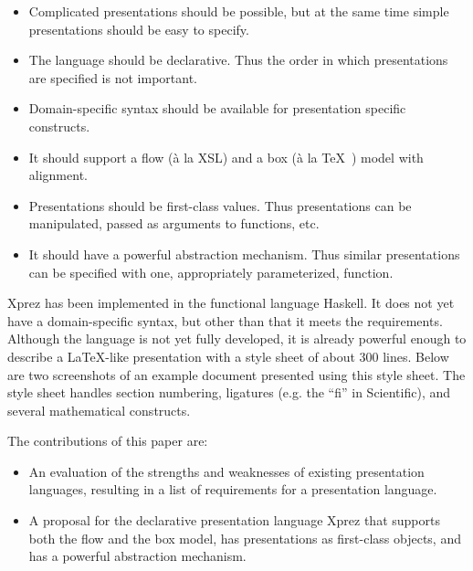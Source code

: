 \begin{itemize}
\item Complicated presentations should be possible, but at the same time simple presentations should be easy to specify.
\item The language should be declarative. Thus the order in which presentations are specified is not important.
\item Domain-specific syntax should be available for presentation specific constructs. 
\item It should support a flow (\`a la XSL) and a box (\`a la \TeX~\cite{tex}) model with alignment.
\item Presentations should be first-class values. Thus presentations can be manipulated, passed as arguments to functions, etc.
\item It should have a powerful abstraction mechanism. Thus similar presentations can be specified with one, appropriately parameterized, function.
\end{itemize}

{\sc Xprez} has been implemented in the functional language Haskell. It does not yet have a domain-specific syntax, but other than that it meets the requirements. Although the language is not yet fully developed, it is already powerful enough to describe a \LaTeX -like presentation with a style sheet of about 300 lines. Below are two screenshots of an example document presented using this style sheet. The style sheet handles section numbering, ligatures (e.g. the ``fi'' in Scientific), and several mathematical constructs.

\begin{center}
 \qquad
{}
\end{center}

The contributions of this paper are:

\begin{itemize}
\item An evaluation of the strengths and weaknesses of existing presentation languages, resulting in a list of requirements for a presentation language.
\item A proposal for the declarative presentation language {\sc Xprez} that supports both the flow and the box model, has presentations as first-class objects, and has a powerful abstraction mechanism.
\end{itemize}

